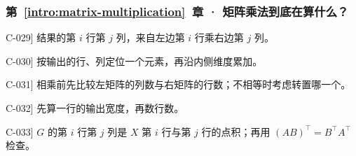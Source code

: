 \subsubsection*{第~\ref*{intro:matrix-multiplication}~章 · 矩阵乘法到底在算什么？}
\begin{answerhints}
\item[\hyperref[exercise:matrix-single-entry]{C-029}] \leavevmode{}\label{hint:matrix-single-entry}结果的第 $i$ 行第 $j$ 列，来自左边第 $i$ 行乘右边第 $j$ 列。
\item[\hyperref[exercise:matrix-batch-calculation]{C-030}] \leavevmode{}\label{hint:matrix-batch-calculation}按输出的行、列定位一个元素，再沿内侧维度累加。
\item[\hyperref[exercise:matrix-shape-correction]{C-031}] \leavevmode{}\label{hint:matrix-shape-correction}相乘前先比较左矩阵的列数与右矩阵的行数；不相等时考虑转置哪一个。
\item[\hyperref[exercise:batch-matrix-sharing]{C-032}] \leavevmode{}\label{hint:batch-matrix-sharing}先算一行的输出宽度，再数行数。
\item[\hyperref[exercise:gram-asymmetry]{C-033}] \leavevmode{}\label{hint:gram-asymmetry}$G$ 的第 $i$ 行第 $j$ 列是 $X$ 第 $i$ 行与第 $j$ 行的点积；再用 $(AB)^\top=B^\top A^\top$ 检查。
\end{answerhints}
